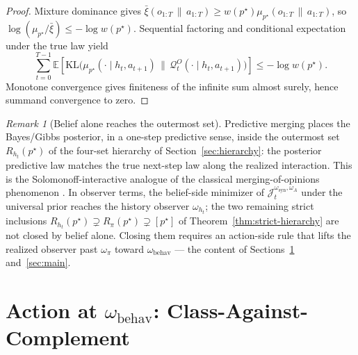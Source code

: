 \documentclass[11pt]{article}
\theoremstyle{definition}
\theoremstyle{remark}
\newtheorem{remark}[theorem]{Remark}
\newcommand{\Qcal}{\mathcal{Q}}
\newcommand{\E}{\mathbb{E}}
\newcommand{\KL}{\mathrm{KL}}
\newcommand{\givena}{\,\|\,}
\newcommand{\barxi}{\bar{\xi}}
\begin{document}
\begin{proof}
Mixture dominance gives $\barxi(o_{1:T}\givena a_{1:T})\ge w(p^\star)\mu_{p^\star}(o_{1:T}\givena a_{1:T})$, so $\log(\mu_{p^\star}/\barxi)\le -\log w(p^\star)$. Sequential factoring and conditional expectation under the true law yield
\[
\sum_{t=0}^{T-1}\E\!\left[\KL\!\bigl(\mu_{p^\star}(\cdot\mid h_t,a_{t+1})\,\|\,\Qcal_t^O(\cdot\mid h_t,a_{t+1})\bigr)\right]
\le -\log w(p^\star).
\]
Monotone convergence gives finiteness of the infinite sum almost surely, hence summand convergence to zero.
\end{proof}

\begin{remark}[Belief alone reaches the outermost set]
\label{rem:belief-reaches-Rht}
Predictive merging places the Bayes/Gibbs posterior, in a one-step predictive sense, inside the outermost set $R_{h_t}(p^\star)$ of the four-set hierarchy of Section~\ref{sec:hierarchy}: the posterior predictive law matches the true next-step law along the realized interaction. This is the Solomonoff-interactive analogue of the classical merging-of-opinions phenomenon \citep{BlackwellDubins1962}. In observer terms, the belief-side minimizer of $\mathcal J_t^{\omega_{\mathrm{syn}},\omega_A}$ under the universal prior reaches the history observer $\omega_{h_t}$; the two remaining strict inclusions $R_{h_t}(p^\star)\supsetneq R_\pi(p^\star)\supsetneq[p^\star]$ of Theorem~\ref{thm:strict-hierarchy} are not closed by belief alone. Closing them requires an action-side rule that lifts the realized observer past $\omega_\pi$ toward $\omega_{\mathrm{behav}}$ --- the content of Sections~\ref{sec:semantic-action} and~\ref{sec:main}.
\end{remark}


\section{Action at $\omega_{\mathrm{behav}}$: Class-Against-Complement}
\label{sec:semantic-action}
\end{document}

